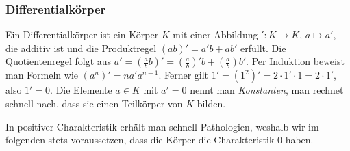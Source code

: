 \documentclass[12pt,a4paper,twoside]{article}
\newcommand{\ei}[1]{\emph{#1}\index{#1}}
\begin{document}
\subsubsection{Differentialk\"orper}
Ein Differentialk\"orper ist ein K\"orper $K$ mit einer Abbildung $':K\to K$,
$a\mapsto a'$, die additiv ist und die Produktregel $(ab)'=a'b+ab'$ erf\"ullt.
Die Quotientenregel folgt aus
$a'=(\frac{a}{b}b)'=(\frac{a}{b})'b+(\frac{a}{b})b'$. Per Induktion beweist
man Formeln wie $(a^n)'=na'a^{n-1}$. Ferner gilt
$1'=(1^2)'=2\cdot1'\cdot1=2\cdot1'$, also $1'=0$. Die Elemente $a\in K$ mit
$a'=0$ nennt man \ei{Konstanten}, man rechnet schnell nach, dass sie einen
Teilk\"orper von $K$ bilden.

In positiver Charakteristik erh\"alt man schnell Pathologien, weshalb wir im
folgenden stets voraussetzen, dass die K\"orper die Charakteristik $0$ haben.
\end{document}
